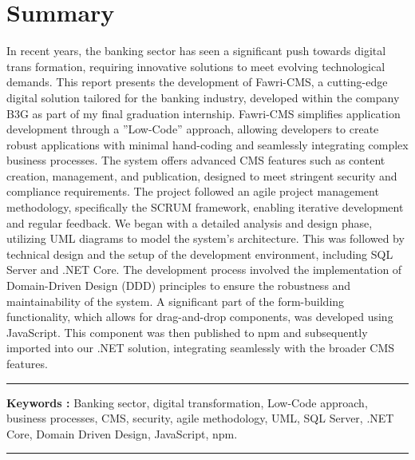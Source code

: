 \chapter*{Summary}

\hspace{\parindent}  In recent years, the banking sector has seen a significant push towards digital trans
formation, requiring innovative solutions to meet evolving technological demands. This report presents the development of Fawri-CMS, a cutting-edge digital solution tailored for the banking industry, developed within the company B3G as part of my final graduation internship.
 Fawri-CMS simplifies application development through a ”Low-Code” approach, allowing developers to create robust applications with minimal hand-coding and seamlessly integrating complex business processes. The system offers advanced CMS features such as content creation, management, and publication, designed to meet stringent security and compliance requirements.
 The project followed an agile project management methodology, specifically the SCRUM
 framework, enabling iterative development and regular feedback. We began with a detailed analysis and design phase, utilizing UML diagrams to model the system’s architecture. This was followed by technical design and the setup of the development environment, including SQL Server and .NET Core.
 The development process involved the implementation of Domain-Driven Design (DDD) principles to ensure the robustness and maintainability of the system. A significant part of the form-building functionality, which allows for drag-and-drop components, was developed using JavaScript. This component was then published to npm and subsequently imported into our .NET solution, integrating seamlessly with the broader CMS features.

\noindent\rule[2pt]{\textwidth}{0.5pt}

{\textbf{Keywords :}}
Banking sector, digital transformation, Low-Code approach, business
 processes, CMS, security, agile methodology, UML, SQL Server, .NET Core, Domain
Driven Design, JavaScript, npm.
\\
\noindent\rule[2pt]{\textwidth}{0.5pt}